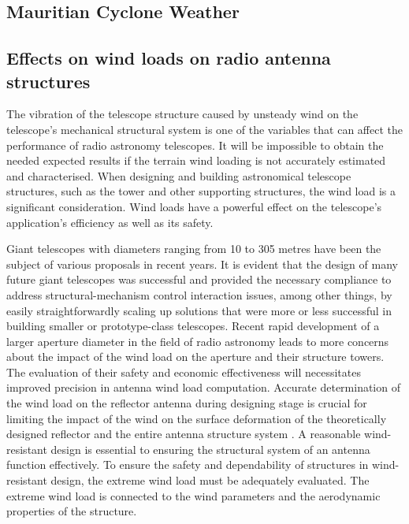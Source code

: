 {\subsection{Mauritian Cyclone Weather}


\subsection{Effects on wind loads on radio antenna structures}


The vibration of the telescope structure caused by unsteady wind on the telescope's mechanical structural system is one of the variables that can affect the performance of radio astronomy telescopes. It will be impossible to obtain the needed expected results if the terrain wind loading is not accurately estimated and characterised. When designing and building astronomical telescope structures, such as the tower and other supporting structures, the wind load is a significant consideration. Wind loads have a powerful effect on the telescope's application's efficiency as well as its safety.


Giant telescopes with diameters ranging from 10 to 305 metres have been the subject of various proposals in recent years\cite{bely2003design}. It is evident that the design of many future giant telescopes was successful and provided the necessary compliance to address structural-mechanism control interaction issues, among other things, by easily straightforwardly scaling up solutions that were more or less successful in building smaller or prototype-class telescopes.
Recent rapid development of a larger aperture diameter in the field of radio astronomy leads to more concerns about the impact of the wind load on the aperture and their structure towers. The evaluation of their safety and economic effectiveness will necessitates improved precision in antenna wind load computation. Accurate determination of the wind load on the reflector antenna during designing stage is crucial for limiting the impact of the wind on the surface deformation of the theoretically designed reflector and the entire antenna structure system \cite{elsbernd1983wind}. A reasonable wind-resistant design is essential to ensuring the structural system of an antenna function effectively. To ensure the safety and dependability of structures in wind-resistant design, the extreme wind load must be adequately evaluated. The extreme wind load is connected to the wind parameters and the aerodynamic properties of the structure.

}
